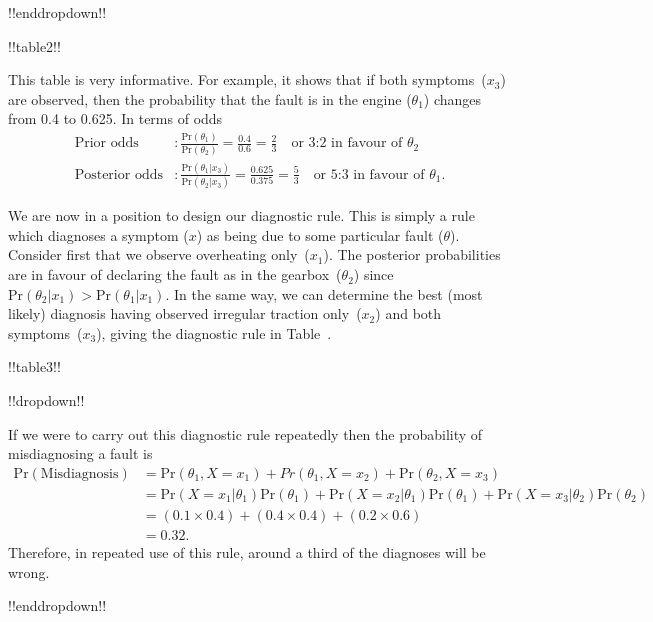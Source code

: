 {!!enddropdown!!



!!table2!!

This table is very informative. For example, it shows that if both
symptoms~($x_3$) are observed, then the probability that the fault is
in the engine ($\theta_1$) changes from 0.4 to 0.625. In terms of
odds
\begin{align*}
\text{Prior odds}&:\frac{\text{Pr}(\theta_1)}{\text{Pr}(\theta_2)}
=\frac{0.4}{0.6}=\frac{2}{3}\quad\text{or 3:2 in favour of }\theta_2 \\
\text{Posterior odds}&:\frac{\text{Pr}(\theta_1|x_3)}{\text{Pr}(\theta_2|x_3)}
=\frac{0.625}{0.375}=
\frac{5}{3}\quad\text{or 5:3 in favour of }\theta_1.
\end{align*}

\clearpage

We are now in a position to design our diagnostic rule. This is simply
a rule which diagnoses a symptom ($x$) as being due to some particular
fault ($\theta$). Consider first that we observe overheating
only~($x_1$). The posterior probabilities are in favour of declaring
the fault as in the gearbox~($\theta_2$) since
$\text{Pr}(\theta_2|x_1)>\text{Pr}(\theta_1|x_1)$. In the same way, we can determine
the best (most likely) diagnosis having observed irregular traction
only~($x_2$) and both symptoms~($x_3$), giving the diagnostic rule in
Table~.



!!table3!!

 !!dropdown!!

If we were to carry out this diagnostic rule repeatedly then the
        probability of misdiagnosing a fault is
        \begin{align*}
        \text{Pr}(\text{Misdiagnosis}) &=\text{Pr}(\theta_1,X=x_1)+Pr(\theta_1,X=x_2)+\text{Pr}(\theta_2,X=x_3) \\
        &=\text{Pr}(X=x_1|\theta_1)\text{Pr}(\theta_1)+\text{Pr}(X=x_2|\theta_1)\text{Pr}(\theta_1) +\text{Pr}(X=x_3|\theta_2)\text{Pr}(\theta_2) \\
        &=(0.1\times 0.4)+(0.4\times 0.4)+(0.2\times 0.6) \\
        &=0.32.
        \end{align*}
        Therefore, in repeated use of this rule, around a third of the
        diagnoses will be wrong.

!!enddropdown!!}

\clearpage

